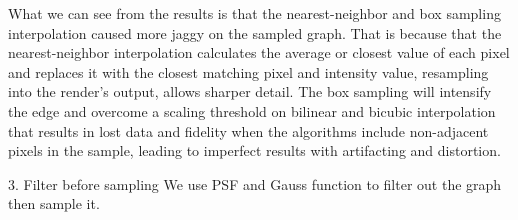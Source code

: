 \documentclass[12pt,a4paper]{article}
\begin{document}
\begin{figure}[H]
\end{figure}
What we can see from the results is that the nearest-neighbor and box sampling interpolation caused
more jaggy on the sampled graph. That is because that the nearest-neighbor interpolation 
calculates the average or closest value of each pixel and replaces it with the closest matching pixel and intensity value, 
resampling into the render's output, allows sharper detail. The box sampling will intensify the edge and overcome a scaling threshold on bilinear and bicubic interpolation
that results in lost data and fidelity when the algorithms include non-adjacent pixels in the sample, 
leading to imperfect results with artifacting and distortion.\par
3. Filter before sampling
We use PSF and Gauss function to filter out the graph then sample it.
\end{document}
